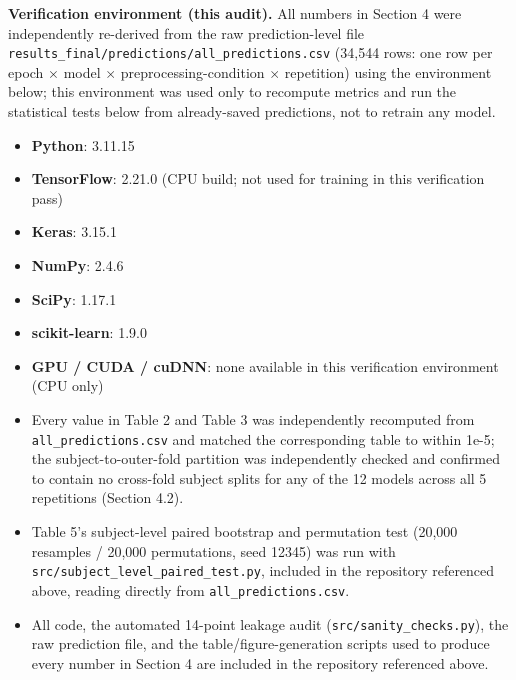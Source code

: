 \documentclass[a4paper,fleqn]{cas-sc}
\begin{document}
\textbf{Verification environment (this audit).} All numbers in Section 4 were independently re-derived from the raw prediction-level file \texttt{results\_final/predictions/all\_predictions.csv} (34,544 rows: one row per epoch $\times$ model $\times$ preprocessing-condition $\times$ repetition) using the environment below; this environment was used only to recompute metrics and run the statistical tests below from already-saved predictions, not to retrain any model.



\begin{itemize}

\item \textbf{Python}: 3.11.15

\item \textbf{TensorFlow}: 2.21.0 (CPU build; not used for training in this verification pass)

\item \textbf{Keras}: 3.15.1

\item \textbf{NumPy}: 2.4.6

\item \textbf{SciPy}: 1.17.1

\item \textbf{scikit-learn}: 1.9.0

\item \textbf{GPU / CUDA / cuDNN}: none available in this verification environment (CPU only)

\item Every value in Table 2 and Table 3 was independently recomputed from \texttt{all\_predictions.csv} and matched the corresponding table to within 1e-5; the subject-to-outer-fold partition was independently checked and confirmed to contain no cross-fold subject splits for any of the 12 models across all 5 repetitions (Section 4.2).

\item Table 5's subject-level paired bootstrap and permutation test (20,000 resamples / 20,000 permutations, seed 12345) was run with \texttt{src/subject\_level\_paired\_test.py}, included in the repository referenced above, reading directly from \texttt{all\_predictions.csv}.

\item All code, the automated 14-point leakage audit (\texttt{src/sanity\_checks.py}), the raw prediction file, and the table/figure-generation scripts used to produce every number in Section 4 are included in the repository referenced above.

\end{itemize}



\end{document}
